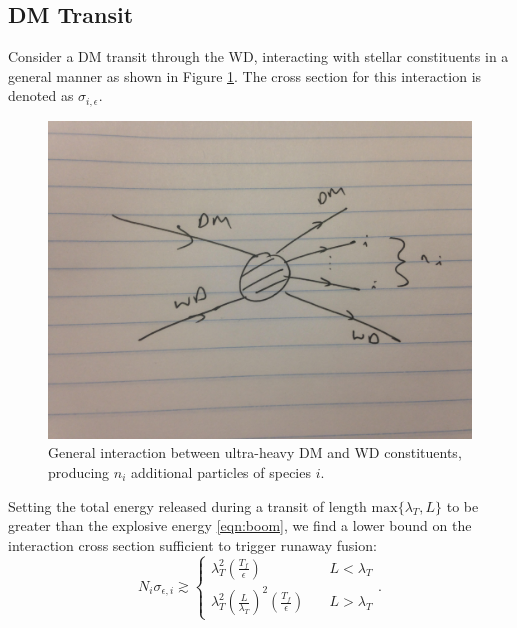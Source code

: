\documentclass[twocolumn,showpacs,preprintnumbers,amsmath,amssymb,prd]{revtex4}
\def\r{\right)}
\def\l{\left(}
\begin{document}
\subsection{DM Transit}
Consider a DM transit through the WD, interacting with stellar constituents in a general manner as shown in Figure \ref{fig:feynmandiag}. The cross section for this interaction is denoted as $\sigma_{i,\epsilon}$.
\begin{figure}
\label{fig:feynmandiag}
\includegraphics[scale=.05]{feynmandiag}
\caption{General interaction between ultra-heavy DM and WD constituents, producing $n_i$ additional particles of species $i$.}
\end{figure}
Setting the total energy released during a transit of length $\text{max}\{\lambda_T, L\}$ to be greater than the explosive energy \eqref{eqn:boom}, we find a lower bound on the interaction cross section sufficient to trigger runaway fusion:
\begin{equation}
\label{eq:transitexplosion}
N_i \sigma_{\epsilon,i} \gtrsim \left\{
        \begin{array}{ll}
            \displaystyle \lambda_T^2 \l \frac{T_f}{\epsilon} \r & \quad L < \lambda_T \\
             \lambda_T^2 \l \frac{L}{\lambda_T}\r^2 \l \frac{T_f}{\epsilon} \r & \quad L > \lambda_T
        \end{array}
    \right..
\end{equation}
\end{document}
